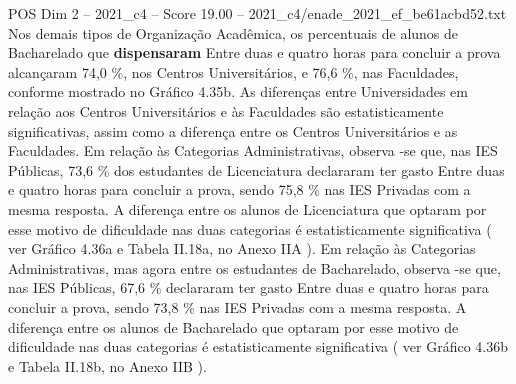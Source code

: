 \begin{textsample}{POS Dim 2 – 2021\_c4 – Score 19.00 – 2021\_c4/enade\_2021\_ef\_be61acbd52.txt}
Nos demais tipos de Organização Acadêmica, os percentuais de alunos de Bacharelado que \textbf{dispensaram} Entre duas e quatro horas para concluir a prova alcançaram 74,0 \%, nos Centros Universitários, e 76,6 \%, nas Faculdades, conforme mostrado no Gráfico 4.35b.
As diferenças entre Universidades em relação aos Centros Universitários e às Faculdades são estatisticamente significativas, assim como a diferença entre os Centros Universitários e as Faculdades.
Em relação às Categorias Administrativas, observa -se que, nas IES Públicas, 73,6 \% dos estudantes de Licenciatura declararam ter gasto Entre duas e quatro horas para concluir a prova, sendo 75,8 \% nas IES Privadas com a mesma resposta.
A diferença entre os alunos de Licenciatura que optaram por esse motivo de dificuldade nas duas categorias é estatisticamente significativa ( ver Gráfico 4.36a e Tabela II.18a, no Anexo IIA ).
Em relação às Categorias Administrativas, mas agora entre os estudantes de Bacharelado, observa -se que, nas IES Públicas, 67,6 \% declararam ter gasto Entre duas e quatro horas para concluir a prova, sendo 73,8 \% nas IES Privadas com a mesma resposta.
A diferença entre os alunos de Bacharelado que optaram por esse motivo de dificuldade nas duas categorias é estatisticamente significativa ( ver Gráfico 4.36b e Tabela II.18b, no Anexo IIB ).

\end{textsample}
